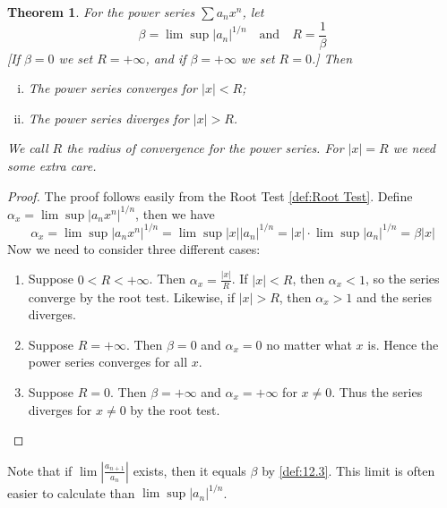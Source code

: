 \documentclass[12pt, lettersize]{book}
\theoremstyle{plain}
\newtheorem{thm}{Theorem}[section]
\theoremstyle{definition}
\theoremstyle{remark}
\begin{document}
			\begin{thm}\label{def:23.1}
			For the power series $\sum a_nx^n$, let
			\begin{displaymath}
				\beta=\lim\sup |a_n|^{1/n}\quad\text{and}\quad R=\frac{1}{\beta}
			\end{displaymath}
			[If $\beta=0$ we set $R=+\infty$, and if $\beta=+\infty$ we set $R=0$.] Then
			\begin{enumerate}[(i)]
				\item The power series converges for $|x|<R$;
				\item The power series diverges for $|x|>R$. 
			\end{enumerate}
			We call $R$ the \emph{radius of convergence} for the power series. For $|x|=R$ we need some extra care.
			\end{thm}
			\begin{proof}
			The proof follows easily from the Root Test \ref{def:Root Test}. Define $\alpha_x=\lim\sup|a_nx^n|^{1/n}$, then
			we have 
			\begin{displaymath}
				\alpha_x=\lim\sup|a_nx^n|^{1/n}=\lim\sup|x||a_n|^{1/n}=|x|\cdot\lim\sup|a_n|^{1/n}=\beta|x|
			\end{displaymath}
			Now we need to consider three different cases:
			\begin{enumerate}
				\item Suppose $0<R<+\infty$. Then $\alpha_x=\frac{|x|}{R}$. If $|x|<R$, then $\alpha_x<1$, so the series
				converge by the root test. Likewise, if $|x|>R$, then $\alpha_x>1$ and the series diverges.
				\item Suppose $R=+\infty$. Then $\beta=0$ and $\alpha_x=0$ no matter what $x$ is. Hence the power series
				converges for all $x$.
				\item Suppose $R=0$. Then $\beta=+\infty$ and $\alpha_x=+\infty$ for $x\neq0$. Thus the series diverges for
				$x\neq0$ by the root test.
			\end{enumerate}
			\end{proof}
			Note that if $\lim\left|\frac{a_{n+1}}{a_n}\right|$ exists, then it equals $\beta$ by \ref{def:12.3}. This limit
			is often easier to calculate than $\lim\sup|a_n|^{1/n}$.
			\newpage
\end{document}
